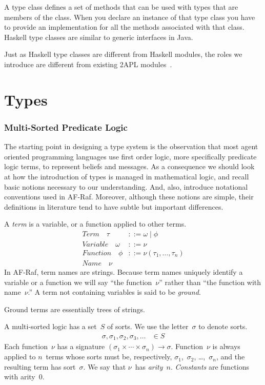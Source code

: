 \documentclass[a4paper,12pt,oneside,fleqn]{book} %
\newcommand{\todo}[1]{[\textcolor{red}{TODO}: #1]}
\begin{document}
A type class defines a set of methods that can be used with types that are
members of the class. When you declare an instance of that type class
you have to provide an implementation for all the methods associated with
that class. Haskell type classes are similar to generic interfaces in Java.

Just as Haskell type classes are different from Haskell modules, the roles
we introduce are different from existing 2APL
modules~\cite{dblp:conf/prima/dastanims08}.
\chapter{Types}\label{ch:types} %
\subsection{Multi-Sorted Predicate Logic} \label{sec:multi-sorted} %

The starting point in designing a type system is the observation that most
agent oriented programming languages use first order logic, more
specifically predicate logic terms, to represent beliefs and messages. As a
consequence we should look at how the introduction of types is managed in
mathematical logic, and recall basic notions necessary to our
understanding. And, also, introduce notational conventions used in AF-Raf.
Moreover, although these notions are simple, their definitions in
literature tend to have subtle but important differences.

A \emph{term} is a variable, or a function applied to other terms.
\begin{align}
\mathit{Term}\quad\tau &::= \omega \mid \phi \\
\mathit{Variable}\quad\omega &::= \nu \\
\mathit{Function}\quad\phi &::= \nu(\tau_1,\ldots,\tau_n) \\
\mathit{Name}\quad\nu
\end{align}
In AF-Raf, term names are strings.  Because term names uniquely identify a
variable or a function we will say ``the function~$\nu$'' rather than ``the
function with name~$\nu$.'' A term not containing variables is said to be
\emph{ground}.

\begin{remark}
Ground terms are essentially trees of strings.
\end{remark}

A multi-sorted logic has a set~$S$ of sorts.  We use the letter~$\sigma$ to
denote sorts.
\begin{align}
\sigma, \sigma_1, \sigma_2, \sigma_3, \ldots &\in S
\end{align}
Each function~$\nu$ has a signature
$(\sigma_1\times\cdots\times\sigma_n)\to\sigma$.  Function~$\nu$ is always
applied to $n$~terms whose sorts must be, respectively,
$\sigma_1$,~$\sigma_2$, \dots,~$\sigma_n$, and the resulting term has
sort~$\sigma$. We say that $\nu$~has \emph{arity}~$n$. \emph{Constants} are
functions with arity~$0$.
\end{document}
